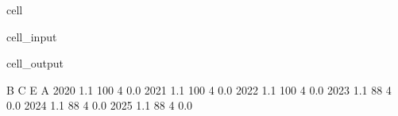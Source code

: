 \documentclass[letterpaper,10pt,english]{jupyterBook}
\begin{document}
\begin{sphinxuseclass}{cell}\begin{sphinxVerbatimInput}

\begin{sphinxuseclass}{cell_input}
\begin{sphinxVerbatim}[commandchars=\\\{\}]
\end{sphinxVerbatim}

\end{sphinxuseclass}\end{sphinxVerbatimInput}
\begin{sphinxVerbatimOutput}

\begin{sphinxuseclass}{cell_output}
\begin{sphinxVerbatim}[commandchars=\\\{\}]
        B    C  E    A
2020  1.1  100  4  0.0
2021  1.1  100  4  0.0
2022  1.1  100  4  0.0
2023  1.1   88  4  0.0
2024  1.1   88  4  0.0
2025  1.1   88  4  0.0
\end{sphinxVerbatim}

\end{sphinxuseclass}\end{sphinxVerbatimOutput}

\end{sphinxuseclass}
\end{document}
